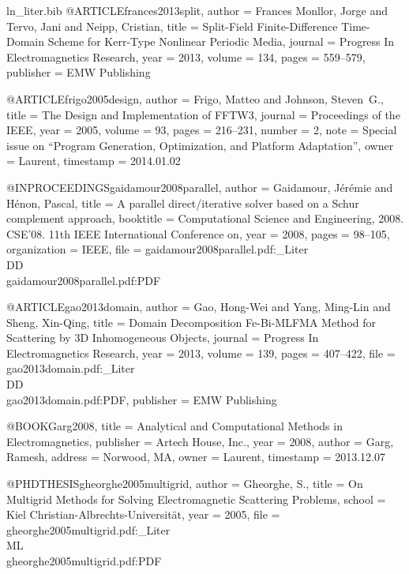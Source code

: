 \begin{filecontents*}{ln_liter.bib}
@ARTICLE{frances2013split,
  author = {Frances Monllor, Jorge and Tervo, Jani and Neipp, Cristian},
  title = {Split-Field Finite-Difference Time-Domain Scheme for {K}err-Type
	Nonlinear Periodic Media},
  journal = {Progress In Electromagnetics Research},
  year = {2013},
  volume = {134},
  pages = {559--579},
  publisher = {EMW Publishing}
}

@ARTICLE{frigo2005design,
  author = {Frigo, Matteo and Johnson, Steven~G.},
  title = {The Design and Implementation of {FFTW3}},
  journal = {Proceedings of the IEEE},
  year = {2005},
  volume = {93},
  pages = {216--231},
  number = {2},
  note = {Special issue on ``Program Generation, Optimization, and Platform
	Adaptation''},
  owner = {Laurent},
  timestamp = {2014.01.02}
}

@INPROCEEDINGS{gaidamour2008parallel,
  author = {Gaidamour, J{\'e}r{\'e}mie and H{\'e}non, Pascal},
  title = {A parallel direct/iterative solver based on a Schur complement approach},
  booktitle = {Computational Science and Engineering, 2008. CSE'08. 11th IEEE International
	Conference on},
  year = {2008},
  pages = {98--105},
  organization = {IEEE},
  file = {gaidamour2008parallel.pdf:_Liter\\DD\\gaidamour2008parallel.pdf:PDF}
}

@ARTICLE{gao2013domain,
  author = {Gao, Hong-Wei and Yang, Ming-Lin and Sheng, Xin-Qing},
  title = {Domain Decomposition Fe-Bi-MLFMA Method for Scattering by 3D Inhomogeneous
	Objects},
  journal = {Progress In Electromagnetics Research},
  year = {2013},
  volume = {139},
  pages = {407--422},
  file = {gao2013domain.pdf:_Liter\\DD\\gao2013domain.pdf:PDF},
  publisher = {EMW Publishing}
}

@BOOK{Garg2008,
  title = {Analytical and Computational Methods in Electromagnetics},
  publisher = {Artech House, Inc.},
  year = {2008},
  author = {Garg, Ramesh},
  address = {Norwood, MA},
  owner = {Laurent},
  timestamp = {2013.12.07}
}

@PHDTHESIS{gheorghe2005multigrid,
  author = {Gheorghe, S.},
  title = {On Multigrid Methods for Solving Electromagnetic Scattering Problems},
  school = {Kiel Christian-Albrechts-Universit\"at},
  year = {2005},
  file = {gheorghe2005multigrid.pdf:_Liter\\ML\\gheorghe2005multigrid.pdf:PDF}
}


\end{filecontents*}
